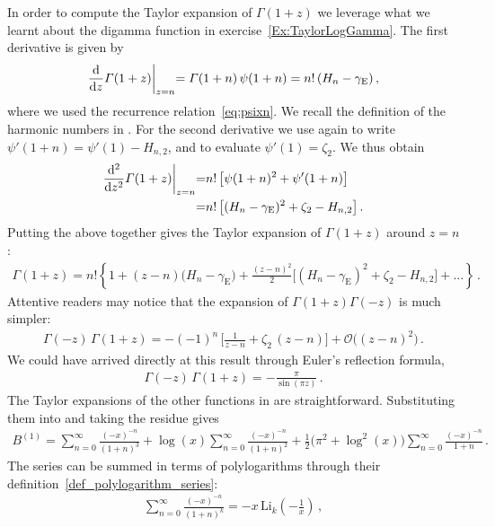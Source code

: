 In order to compute the Taylor expansion of $\Gamma(1+z)$ we leverage what we learnt about the digamma function in exercise~\ref{Ex:TaylorLogGamma}.
The first derivative is given by
\begin{align}
\frac{\d}{\d z} \Gamma(1+z) \biggl|_{z=n} = \Gamma(1+n) \, \psi(1+n) = n! \, (H_n - \gamma_{\text{E}}) \,,
\end{align}
where we used the recurrence relation~\eqref{eq:psixn}. We recall the definition of the harmonic numbers in . For the second derivative we use again  to write $\psi'(1+n) = \psi'(1) - H_{n,2}$, and  to evaluate $\psi'(1) = \zeta_2$. We thus obtain
\begin{align}
\frac{\d^2}{\d z^2} \Gamma(1+z) \biggl|_{z=n} =& n! \, \bigl[ \psi(1+n)^2 + \psi'(1+n) \bigl] \nonumber \\
=& n! \, \bigl[ (H_n-\gamma_{\text{E}})^2 + \zeta_2 - H_{n,2} \bigr] \,.
\end{align}
Putting the above together gives the Taylor expansion of $\Gamma(1+z)$ around $z=n$:
\begin{align} \label{eq:ExpGamma1pz}
\Gamma(1+z) = n! \left\{ 1 + (z-n) \bigl( H_n - \gamma_{\text{E}}\bigr) + \frac{(z-n)^2}{2} \bigl[ (H_n-\gamma_{\text{E}})^2+\zeta_2-H_{n,2} \bigr] 
  + \ldots \right\}\,.
\end{align}
Attentive readers may notice that the expansion of $\Gamma(1+z) \Gamma(-z)$ is much simpler:
\begin{align}
\Gamma(-z) \, \Gamma(1+z) = - (-1)^n \, \biggl[ \frac{1}{z-n} + \zeta_2 \, (z-n) \biggr] + \mathcal{O}\bigl((z-n)^2\bigr) \,.
\end{align}
We could have arrived directly at this result through Euler's reflection formula,
\begin{align}
\Gamma(-z) \, \Gamma(1+z) = -\frac{\pi}{\sin(\pi z)} \,.
\end{align}
The Taylor expansions of the other functions in  are straightforward.
Substituting them into  and taking the residue gives
\begin{align} \label{eq:MBboxB1b}
B^{(1)}  = \sum_{n=0}^{\infty} \frac{(-x)^{-n}}{(1+n)^3} + \log(x) \sum_{n=0}^{\infty} \frac{(-x)^{-n}}{(1+n)^2}  +
  \frac{1}{2} \bigl(\pi^2+\log^2(x)\bigr) \sum_{n=0}^{\infty} \frac{(-x)^{-n}}{1+n} \,.
\end{align}
The series can be summed in terms of polylogarithms through their definition~\eqref{def_polylogarithm_series}:
\begin{align}
\sum_{n=0}^{\infty}  \frac{(-x)^{-n}}{(1+n)^k} = - x \, \mathrm{Li}_k\left(-\frac{1}{x}\right) \,,
\end{align}
